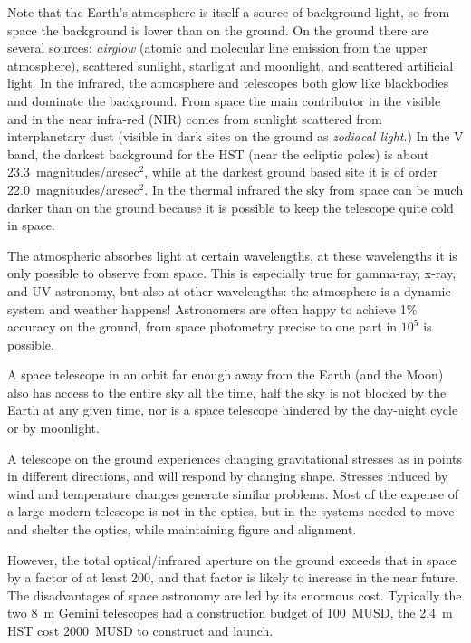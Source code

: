 \documentclass{article}
\begin{document}
Note that the Earth's atmosphere is itself a source of background light, so from space the
background is lower than on the ground. On the ground there are several sources: {\it 
airglow} (atomic and molecular line emission from the upper atmosphere), scattered sunlight,
starlight and moonlight, and scattered artificial light. In the infrared, the atmosphere and
telescopes both glow like blackbodies and dominate the background. From space the main
contributor in the visible and in the near infra-red (NIR) comes from sunlight scattered from 
interplanetary dust (visible in dark sites on the ground as {\it zodiacal light}.) In the 
V band, the darkest background for the HST (near the ecliptic poles) is about 
23.3~magnitudes/arcsec$^2$, while at the darkest ground based site it is of order 
22.0~magnitudes/arcsec$^2$. In the thermal infrared the sky from space can be much darker than 
on the ground because it is possible to keep the telescope quite cold in space.

The atmospheric absorbes light at certain wavelengths, at these wavelengths it is only possible
to observe from space. This is especially true for gamma-ray, x-ray, and UV astronomy, but also
at other wavelengths: the atmosphere is a dynamic system and weather happens! Astronomers
are often happy to achieve 1\% accuracy on the ground, from space photometry precise to
one part in $10^5$ is possible.

A space telescope in an orbit far enough away from the Earth (and the Moon) also has access 
to the entire sky all the time, half the sky is not blocked by the Earth at any given time, 
nor is a space telescope hindered by the day-night cycle or by moonlight.

A telescope on the ground experiences changing gravitational stresses as in points in different
directions, and will respond by changing shape. Stresses induced by wind and temperature changes
generate similar problems. Most of the expense of a large modern telescope is not in the optics, 
but in the systems needed to move and shelter the optics, while maintaining figure and alignment.

However, the total optical/infrared aperture on the ground exceeds that in space by a factor of
at least 200, and that factor is likely to increase in the near future. The disadvantages of
space astronomy are led by its enormous cost. Typically the two 8~m Gemini telescopes had a 
construction budget of 100~MUSD, the 2.4~m HST cost 2000~MUSD to construct and launch.
\end{document}
